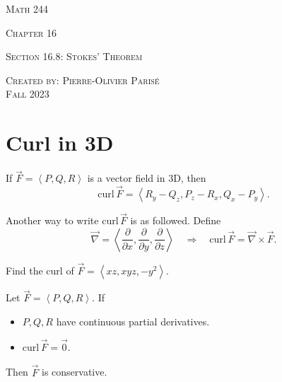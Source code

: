 \documentclass[20pt,a4paper]{extarticle}
\newcommand{\curl}{\mathrm{curl} \,}
\newcounter{example}[section]
\newcounter{theorem}
\newcounter{definition}
\begin{document}
\thispagestyle{empty}

\begin{center}
\vspace*{2.5cm}

{\Huge \textsc{Math 244}}

\vspace*{2cm}

{\LARGE \textsc{Chapter 16}} 

\vspace*{0.75cm}

\noindent\textsc{Section 16.8: Stokes' Theorem}

\vspace*{0.75cm}

\tableofcontents

\vfill

\noindent \textsc{Created by: Pierre-Olivier Paris{\'e}} \\
\textsc{Fall 2023}
\end{center}

\newpage

\section{Curl in 3D}

\begin{definition}
If $\vec{F} = \left\langle P, Q, R \right\rangle$ is a vector field in 3D, then
	\[
		\curl \vec{F} = \left\langle R_y - Q_z , P_z - R_x , Q_x - P_y \right\rangle .
	\]
\end{definition}

Another way to write $\curl \vec{F}$ is as followed. Define
	\[
		\vec{\nabla} = \left\langle \frac{\partial}{\partial x} , \frac{\partial}{\partial y} , \frac{\partial}{\partial z} \right\rangle \quad \Longrightarrow \quad \curl \vec{F} = \vec{\nabla} \times \vec{F} .
	\]

\begin{example}
Find the curl of $\vec{F} = \left\langle xz , xyz , -y^2 \right\rangle$.
\end{example}

\begin{notes}

\end{notes}

\newpage 

\begin{theorem}
Let $\vec{F} = \left\langle P , Q, R \right\rangle$. If
	\begin{itemize}
		\item $P, Q, R$ have continuous partial derivatives.
		\item $\curl \vec{F} = \vec{0}$.
	\end{itemize}
Then $\vec{F}$ is conservative.
\end{theorem}
\end{document}
